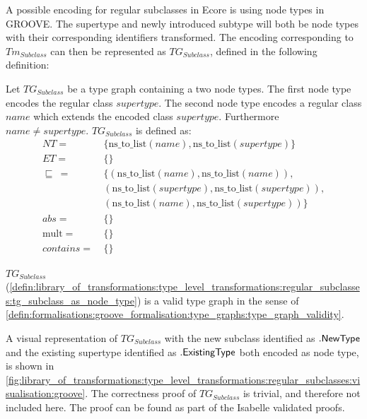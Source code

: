 A possible encoding for regular subclasses in Ecore is using node types in GROOVE. The supertype and newly introduced subtype will both be node types with their corresponding identifiers transformed. The encoding corresponding to $Tm_{Subclass}$ can then be represented as $TG_{Subclass}$, defined in the following definition:

\begin{defin}
\label{defin:library_of_transformations:type_level_transformations:regular_subclasses:tg_subclass_as_node_type}
Let $TG_{Subclass}$ be a type graph containing a two node types. The first node type encodes the regular class $supertype$. The second node type encodes a regular class $name$ which extends the encoded class $supertype$. Furthermore $name \neq supertype$. $TG_{Subclass}$ is defined as:
\begin{align*}
NT =\ &\{\mathrm{ns\_\!to\_\!list}(name), \mathrm{ns\_\!to\_\!list}(supertype)\} \\
ET =\ &\{\} \\
\!\!\sqsubseteq\ =\ &\{
(\mathrm{ns\_\!to\_\!list}(name), \mathrm{ns\_\!to\_\!list}(name)), \\&
(\mathrm{ns\_\!to\_\!list}(supertype), \mathrm{ns\_\!to\_\!list}(supertype)), \\&
(\mathrm{ns\_\!to\_\!list}(name), \mathrm{ns\_\!to\_\!list}(supertype))
\} \\
abs =\ &\{\} \\
\mathrm{mult} =\ &\{\} \\
contains =\ &\{\}
\end{align*}
\end{defin}

\begin{thm}
\label{defin:library_of_transformations:type_level_transformations:regular_subclasses:tg_subclass_as_node_type_correct}
$TG_{Subclass}$ (\cref{defin:library_of_transformations:type_level_transformations:regular_subclasses:tg_subclass_as_node_type}) is a valid type graph in the sense of \cref{defin:formalisations:groove_formalisation:type_graphs:type_graph_validity}.
\end{thm}

A visual representation of $TG_{Subclass}$ with the new subclass identified as $.\mathsf{NewType}$ and the existing supertype identified as $.\mathsf{ExistingType}$ both encoded as node type, is shown in \cref{fig:library_of_transformations:type_level_transformations:regular_subclasses:visualisation:groove}. The correctness proof of $TG_{Subclass}$ is trivial, and therefore not included here. The proof can be found as part of the Isabelle validated proofs.

